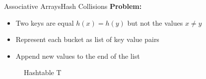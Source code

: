 \begin{frame}{Associative Arrays}{Hash Collisions}
  \textbf{Problem:}
  \begin{itemize}
    \item
      Two keys are equal {\color{MainA} $h(x) = h(y)$} but not the values
      {\color{MainA} $x \neq y$}
  \end{itemize}
  \begin{itemize}
    \item<3->
      Represent each bucket as list of key value pairs
    \item<4->
      Append new values to the end of the list
  \end{itemize}
    \vspace*{-1.0em}
    \begin{figure}
    \caption{Hashtable T}
    \centering
  \end{figure}
\end{frame}



